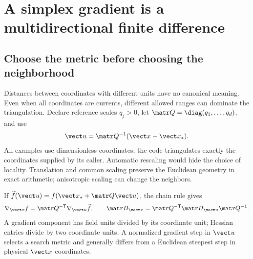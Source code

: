 \section{A simplex gradient is a multidirectional finite difference}
\subsection{Choose the metric before choosing the neighborhood}
Distances between coordinates with different units have no canonical meaning.
Even when all coordinates are currents, different allowed ranges can dominate
the triangulation. Declare reference scales $q_j>0$, let
$\matr Q=\diag(q_1,\ldots,q_d)$, and use
\begin{equation}
 \vect u=\matr Q^{-1}(\vect x-\vect x_*).
 \label{eq:metric}
\end{equation}
All examples use dimensionless coordinates; the code triangulates exactly
the coordinates supplied by its caller. Automatic rescaling would hide the
choice of locality. Translation and common scaling preserve the Euclidean
geometry in exact arithmetic; anisotropic scaling can change the neighbors.

If $\widetilde f(\vect u)=f(\vect x_*+\matr Q\vect u)$, the chain rule gives
\begin{equation}
 \nabla_{\vect x} f=\matr Q^{-\mathsf T}\nabla_{\vect u}\widetilde f,
 \qquad
 \matr H_{\vect x}=\matr Q^{-\mathsf T}\matr H_{\vect u}\matr Q^{-1}.
 \label{eq:chain}
\end{equation}
A gradient component has field units divided by its coordinate unit;
Hessian entries divide by two coordinate units. A normalized gradient step
in $\vect u$ selects a search metric and generally differs from a Euclidean
steepest step in physical $\vect x$ coordinates.

